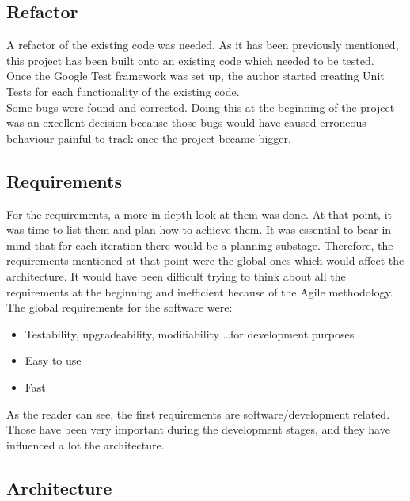 \subsection{Refactor}

A refactor of the existing code was needed. As it has been previously mentioned, this project has been built onto an existing code which needed to be tested.  \\
Once the Google Test framework was set up, the author started creating Unit Tests for each functionality of the existing code. \\
Some bugs were found and corrected. Doing this at the beginning of the project was an excellent decision because those bugs would have caused erroneous behaviour painful to track once the project became bigger. 

\subsection{Requirements}
For the requirements, a more in-depth look at them was done. At that point, it was time to list them and plan how to achieve them. It was essential to bear in mind that for each iteration there would be a planning substage. Therefore, the requirements mentioned at that point were the global ones which would affect the architecture. It would have been difficult trying to think about all the requirements at the beginning and inefficient because of the Agile methodology. The global requirements for the software were: 

\begin{itemize}
	\item Testability, upgradeability, modifiability \ldots for development purposes
	\item Easy to use
	\item Fast
\end{itemize}
As the reader can see, the first requirements are software/development related. Those have been very important during the development stages, and they have influenced a lot the architecture.  

\subsection{Architecture}

